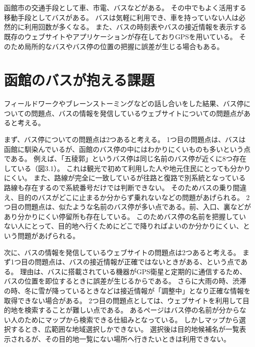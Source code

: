 \documentclass[openany,11pt,papersize]{jsbook}
\begin{document}
\section{}

函館市の交通手段として車、市電、バスなどがある。
その中でもよく活用する移動手段としてバスがある。
バスは気軽に利用でき、車を持っていない人は必然的に利用回数が多くなる。
また、バスの時刻表やバスの接近情報を表示する既存のウェブサイトやアプリケーションが存在しておりGPSを用いている。
そのため局所的なバスやバス停の位置の把握に誤差が生じる場合もある。


\section{函館のバスが抱える課題}

フィールドワークやブレーンストーミングなどの話し合いをした結果、バス停についての問題点、バスの情報を発信しているウェブサイトについての問題点があると考える。

まず、バス停についての問題点は2つあると考える。
1つ目の問題点は、バスは函館に馴染んでいるが、函館のバス停の中にはわかりにくいものも多いという点である。
例えば、「五稜郭」というバス停は同じ名前のバス停が近くに8つ存在している（図3.1）。
これは観光で初めて利用した人や地元住民にとっても分かりにくい。
また、路線が完全に一致しているが往路と復路で別系統となっている路線も存在するので系統番号だけでは判断できない。
そのためバスの乗り間違え、目的のバスがどこに止まるか分からず乗れないなどの問題があげられる。
2つ目の問題点は、似たような名前のバス停が多い点である。前、入口、裏などがあり分かりにくい停留所も存在している。
このためバス停の名前を把握していない人にとって、目的地へ行くためにどこで降りればよいのか分かりにくい、という問題があげられる。

次に、バスの情報を発信しているウェブサイトの問題点は2つあると考える。
まず1つ目の問題点は、バスの接近情報が正確ではないときがある、という点である。
理由は、バスに搭載されている機器がGPS衛星と定期的に通信するため、バスの位置を即位するときに誤差が生じるからである。
さらに大雨の時、渋滞の時、冬に雪が降っているときなどは接近情報が「調整中」となり正確な情報を取得できない場合がある。
2つ目の問題点としては、ウェブサイトを利用して目的地を検索することが難しい点である。
あるページはバス停の名前が分からない人のためにマップから検索できる仕組みとなっている。
しかしマップから選択するとき、広範囲な地域選択しかできない。
選択後は目的地候補名が一覧表示されるが、その目的地一覧にない場所へ行きたいときは利用できない。
\end{document}
